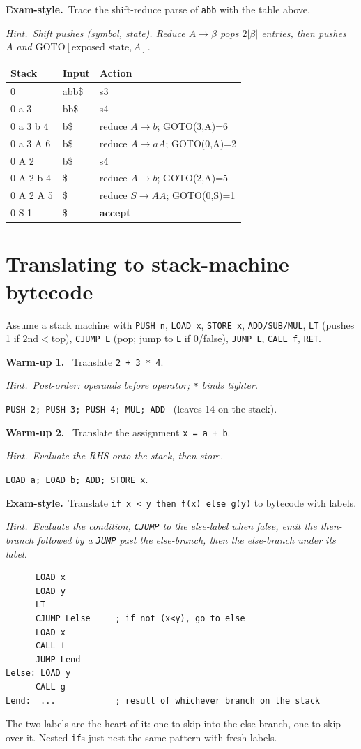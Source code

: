 \documentclass[11pt,a4paper]{article}
\newcommand{\hint}[1]{\par{\small\textcolor{accent}{\textit{Hint.}}\ \textit{#1}}\par\smallskip}
\newcommand{\warm}[1]{\smallskip\textbf{\textcolor{hi}{Warm-up #1.}}\ }
\newcommand{\exam}{\smallskip\textbf{\textcolor{warn}{Exam-style.}}\ }
\begin{document}
\exam Trace the shift-reduce parse of \texttt{abb} with the table above.
\hint{Shift pushes (symbol, state). Reduce $A\to\beta$ pops $2|\beta|$ entries, then pushes $A$ and $\mathrm{GOTO}[\text{exposed state},A]$.}
\begin{sol}
\begin{center}\small
\begin{tabular}{lll}
Stack & Input & Action\\\hline
0 & abb\$ & s3\\
0 a 3 & bb\$ & s4\\
0 a 3 b 4 & b\$ & reduce $A\to b$; GOTO(3,A)=6\\
0 a 3 A 6 & b\$ & reduce $A\to aA$; GOTO(0,A)=2\\
0 A 2 & b\$ & s4\\
0 A 2 b 4 & \$ & reduce $A\to b$; GOTO(2,A)=5\\
0 A 2 A 5 & \$ & reduce $S\to AA$; GOTO(0,S)=1\\
0 S 1 & \$ & \textbf{accept}\\
\end{tabular}
\end{center}
\end{sol}

\section{Translating to stack-machine bytecode}

Assume a stack machine with \texttt{PUSH n}, \texttt{LOAD x}, \texttt{STORE x}, \texttt{ADD/SUB/MUL}, \texttt{LT} (pushes 1 if $2$nd${<}$top), \texttt{CJUMP L} (pop; jump to \texttt{L} if 0/false), \texttt{JUMP L}, \texttt{CALL f}, \texttt{RET}.

\warm{1} Translate \texttt{2 + 3 * 4}.
\hint{Post-order: operands before operator; \texttt{*} binds tighter.}
\begin{sol}
\texttt{PUSH 2; PUSH 3; PUSH 4; MUL; ADD} \ (leaves 14 on the stack).
\end{sol}

\warm{2} Translate the assignment \texttt{x = a + b}.
\hint{Evaluate the RHS onto the stack, then store.}
\begin{sol}
\texttt{LOAD a; LOAD b; ADD; STORE x}.
\end{sol}

\exam Translate \texttt{if x < y then f(x) else g(y)} to bytecode with labels.
\hint{Evaluate the condition, \texttt{CJUMP} to the else-label when false, emit the then-branch followed by a \texttt{JUMP} past the else-branch, then the else-branch under its label.}
\begin{sol}
\begin{verbatim}
      LOAD x
      LOAD y
      LT
      CJUMP Lelse     ; if not (x<y), go to else
      LOAD x
      CALL f
      JUMP Lend
Lelse: LOAD y
      CALL g
Lend:  ...            ; result of whichever branch on the stack
\end{verbatim}
The two labels are the heart of it: one to skip into the else-branch, one to skip over it. Nested \texttt{if}s just nest the same pattern with fresh labels.
\end{sol}
\end{document}
